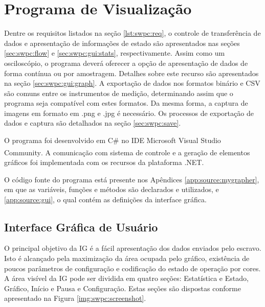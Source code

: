 \chapter{Programa de Visualização}\label{cap:swpc}

		Dentre os requisitos listados na seção \ref{lst:swpc:req}, o controle de transferência de dados e apresentação de informações de estado são apresentados nas seções \ref{sec:swpc:flow} e \ref{sec:swpc:gui:stats}, respectivamente. Assim como um osciloscópio, o programa deverá oferecer a opção de apresentação de dados de forma contínua ou por amostragem. Detalhes sobre este recurso são apresentados na seção \ref{sec:swpc:gui:graph}. A exportação de dados nos formatos binário e CSV são comuns entre os instrumentos de medição, determinando assim que o programa seja compatível com estes formatos. Da mesma forma, a captura de imagens em formato em .png e .jpg é necessário. Os processos de exportação de dados e captura são detalhados na seção \ref{sec:swpc:save}.

		O programa foi desenvolvido em C\# no IDE Microsoft Visual Studio Community\textsuperscript{\textregistered}. A comunicação com sistema de controle e a geração de elementos gráficos foi implementada com os recursos da plataforma .NET.

		O código fonte do programa está presente nos Apêndices \ref{app:source:mygrapher}, em que as variáveis, funções e métodos são declarados e utilizados, e \ref{app:source:gui}, o qual contém as definições da interface gráfica.

	\section{Interface Gráfica de Usuário}\label{sec:swpc:gui}

		O principal objetivo da IG é a fácil apresentação dos dados enviados pelo escravo. Isto é alcançado pela maximização da área ocupada pelo gráfico, existência de poucos parâmetros de configuração e codificação do estado de operação por cores. A área visível da IG pode ser dividida em quatro seções: Estatística e Estado, Gráfico, Início e Pausa e Configuração. Estas seções são dispostas conforme apresentado na Figura \ref{img:swpc:screenshot}.

